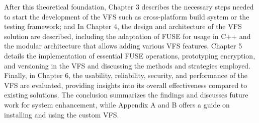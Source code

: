 After this theoretical foundation, Chapter 3 describes the necessary steps needed to start the development of the VFS such as cross-platform build system or the testing framework;
and In Chapter 4, the design and architecture of the VFS solution are described, including the adaptation of FUSE for usage in C++ and the modular architecture that allows adding various VFS features.
Chapter 5 details the implementation of essential FUSE operations, prototyping encryption, and versioning in the VFS and discussing the methods and strategies employed.
Finally, in Chapter 6, the usability, reliability, security, and performance of the VFS are evaluated, providing insights into its overall effectiveness compared to existing solutions.
The conclusion summarizes the findings and discusses future work for system enhancement, while Appendix A and B offers a guide on installing and using the custom VFS.